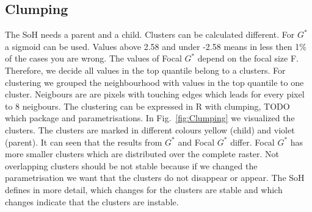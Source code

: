 \documentclass{itatnew}
\begin{document}
\subsection{Clumping}
The SoH needs a parent and a child. Clusters can be calculated different. For $G^*$ a sigmoid can be used. Values above 2.58 and under -2.58 means in less then 
1\% of the cases you are wrong. The values of Focal $G^*$ depend on the focal size F. Therefore, we decide all values in the top quantile belong to a clusters.
For clustering we grouped the neighbourhood with values in the top quantile to one cluster. 
Neigbours are are pixels with touching edges which leads for every pixel to 8 neigbours.
The clustering can be expressed in R with clumping, TODO which package and parametrisations.
In Fig.~\ref{fig:Clumping} we visualized the clusters. The clusters are marked in different colours yellow (child) and violet (parent).
It can seen that the results from $G^*$ and Focal $G^*$ differ. Focal $G^*$ has more smaller clusters which are distributed over the complete raster.
Not overlapping clusters should be not stable because if we changed the parametrisation we want that the clusters do not disappear or appear. 
The SoH defines in more detail, which changes for the clusters are stable and which changes indicate that the clusters are instable.
\end{document}
